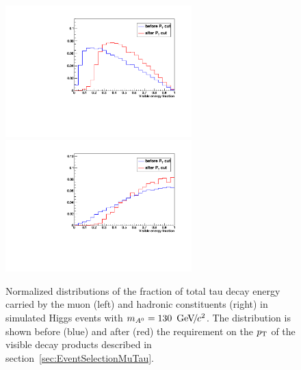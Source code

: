 \begin{figure}[t]
\begin{center}
\includegraphics*[width=72mm]{svfit_chapter/figures/scuplting_A130_muon.pdf}
\includegraphics*[width=72mm]{svfit_chapter/figures/scuplting_A130_tau.pdf}
\caption[Effect of the visible \pt requirements on muon and hadronic $\tau$
decays]{\captiontext Normalized distributions of the fraction of total tau decay
energy carried by the muon (left) and hadronic constituents (right) in simulated
Higgs events with \mbox{$m_{A^0} = 130~{\,\text{Ge\hspace{-.08em}V\hspace{-0.16em}/\hspace{-0.08em}}c^\text{2}}$}.  The distribution is shown before
(blue) and after (red) the requirement on the $p_{\mathrm{T}}$ of the visible decay
products described in section~\ref{sec:EventSelectionMuTau}.  }
\label{fig:ptBalancePtVisCuts}
\end{center}
\end{figure} 

